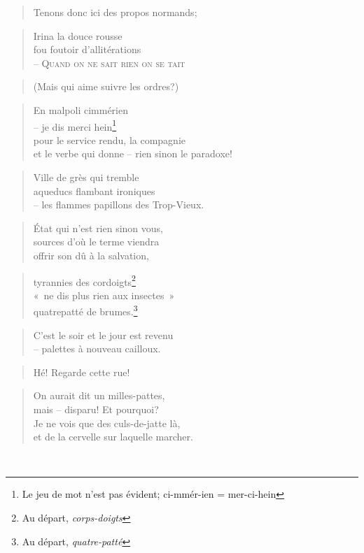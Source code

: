   \begin{verse}
    Tenons donc ici des propos normands;
  \end{verse}
  \begin{verse}
    Irina la douce rousse\\
    fou foutoir d’allitérations\\
    -- \textsc{Quand on ne sait rien on se tait}
  \end{verse}
  \begin{verse}
    (Mais qui aime suivre les ordres?)
  \end{verse}
  \begin{verse}
    En malpoli cimmérien\\
    -- je dis merci hein\footnote{Le jeu de mot n’est pas évident; ci-mmér-ien = mer-ci-hein}\\
    pour le service rendu, la compagnie\\
    et le verbe qui donne -- rien sinon le paradoxe!
  \end{verse}
  \begin{verse}
    Ville de grès qui tremble\\
    aqueducs flambant ironiques\\
    -- les flammes papillons des Trop-Vieux.
  \end{verse}
  \begin{verse}
    État qui n’est rien sinon vous,\\
    sources d’où le terme viendra\\
    offrir son dû à la salvation,
  \end{verse}
  \begin{verse}
    tyrannies des cordoigts\footnote{Au départ, \textit{corps-doigts}}\\
    «~ne dis plus rien aux insectes~»\\
    quatrepatté de brumes.\footnote{Au départ, \textit{quatre-patté}}
  \end{verse}
  \begin{verse}
    C’est le soir et le jour est revenu\\
    -- palettes à nouveau cailloux.
  \end{verse}
  \begin{verse}
    Hé! Regarde cette rue!
  \end{verse}
  \begin{verse}
    On aurait dit un milles-pattes,\\
    mais -- disparu! Et pourquoi?\\
    Je ne vois que des culs-de-jatte là,\\
    et de la cervelle sur laquelle marcher.
  \end{verse}\\
